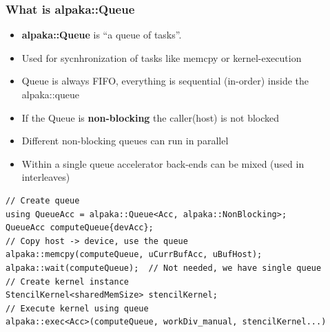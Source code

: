 \documentclass[9pt]{beamer}
\begin{document}
\begin{frame} [fragile]
\frametitle{What is alpaka::Queue}
\begin{itemize}
 \item \textbf{alpaka::Queue} is “a queue of tasks”.
 \item Used for sycnhronization of tasks like memcpy or kernel-execution
 \item Queue is always FIFO, everything is sequential (in-order) inside the alpaka::queue
 \item If the Queue is \textbf{non-blocking} the caller(host) is not blocked
 \item Different non-blocking queues can run in parallel
 \item Within a single queue accelerator back-ends can be mixed (used in interleaves)
\end{itemize}
\lstset{basicstyle=\ttfamily\scriptsize}
\begin{lstlisting}
// Create queue
using QueueAcc = alpaka::Queue<Acc, alpaka::NonBlocking>;
QueueAcc computeQueue{devAcc};
// Copy host -> device, use the queue
alpaka::memcpy(computeQueue, uCurrBufAcc, uBufHost);
alpaka::wait(computeQueue);  // Not needed, we have single queue
// Create kernel instance
StencilKernel<sharedMemSize> stencilKernel;
// Execute kernel using queue
alpaka::exec<Acc>(computeQueue, workDiv_manual, stencilKernel...)
\end{lstlisting}
\end{frame}
\end{document}
